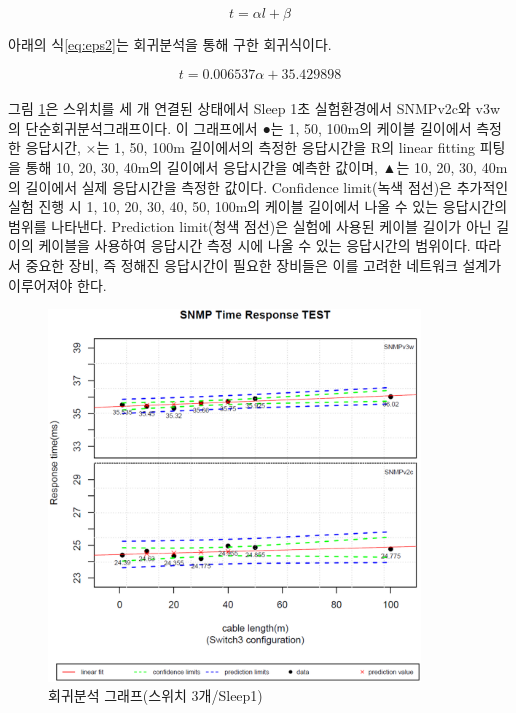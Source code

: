 \documentclass[11pt
  , a4paper
  , article
  , oneside
]{memoir}
\begin{document}
\begin{equation} \label{eq:eps}
  t=\alpha l + \beta  
\end{equation}

아래의 식\ref{eq:eps2}는 회귀분석을 통해 구한 회귀식이다. 

\begin{equation} \label{eq:eps2}
  t=0.006537\alpha + 35.429898  
\end{equation}
\\
그림 \ref{fig:s3s1}은 스위치를 세 개 연결된 상태에서 Sleep 1초 실험환경에서 SNMPv2c와 v3w의 단순회귀분석그래프이다. 이 그래프에서 ●는 1, 50, 100m의 케이블 길이에서 측정한 응답시간, ×는 1, 50, 100m 길이에서의 측정한 응답시간을 R의 linear fitting 피팅을 통해 10, 20, 30, 40m의 길이에서 응답시간을 예측한 값이며, ▲는 10, 20, 30, 40m의 길이에서 실제 응답시간을 측정한 값이다. Confidence limit(녹색 점선)은 추가적인 실험 진행 시 1, 10, 20, 30, 40, 50, 100m의 케이블 길이에서 나올 수 있는 응답시간의 범위를 나타낸다. Prediction limit(청색 점선)은 실험에 사용된 케이블 길이가 아닌 길이의 케이블을 사용하여 응답시간 측정 시에 나올 수 있는 응답시간의 범위이다. 따라서 중요한 장비, 즉 정해진 응답시간이 필요한 장비들은 이를 고려한 네트워크 설계가 이루어져야 한다. 

\begin{figure}[!h]
  \centering
  \includegraphics[width=0.88\textwidth]{./images/s3s1.eps}
  \caption{회귀분석 그래프(스위치 3개/Sleep1)}
  \label{fig:s3s1}   
\end{figure}
\end{document}
